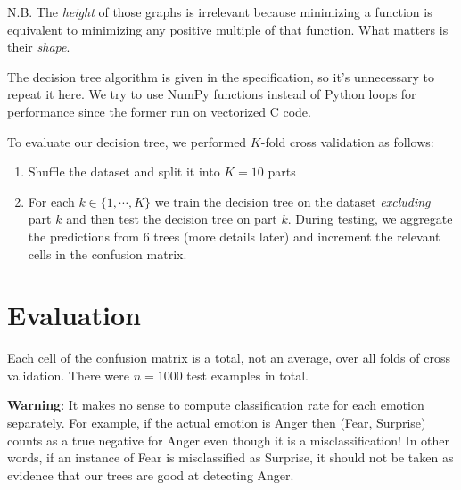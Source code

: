 \documentclass[12pt, a4paper]{article}
\begin{document}
N.B. The \textit{height} of those graphs is irrelevant because minimizing a function is equivalent to minimizing any positive multiple of that function. What matters is their \textit{shape}.\par
\bigskip
The decision tree algorithm is given in the specification, so it's unnecessary to repeat it here. We try to use NumPy functions instead of Python loops for performance since the former run on vectorized C code.\par
\bigskip
To evaluate our decision tree, we performed $K$-fold cross validation as follows:
\begin{enumerate}
    \item Shuffle the dataset and split it into $K = 10$ parts
    \item For each $k \in \{1, \dotsm, K\}$ we train the decision tree on the dataset \textit{excluding} part $k$ and then test the decision tree on part $k$. During testing, we aggregate the predictions from 6 trees (more details later) and increment the relevant cells in the confusion matrix.
\end{enumerate}

\section*{Evaluation}
Each cell of the confusion matrix is a total, not an average, over all folds of cross validation. There were $n = 1000$ test examples in total.\par
\bigskip
\textbf{Warning}: It makes no sense to compute classification rate for each emotion separately. For example, if the actual emotion is Anger then (Fear, Surprise) counts as a true negative for Anger even though it is a misclassification! In other words, if an instance of Fear is misclassified as Surprise, it should not be taken as evidence that our trees are good at detecting Anger.\par
\bigskip
\end{document}
